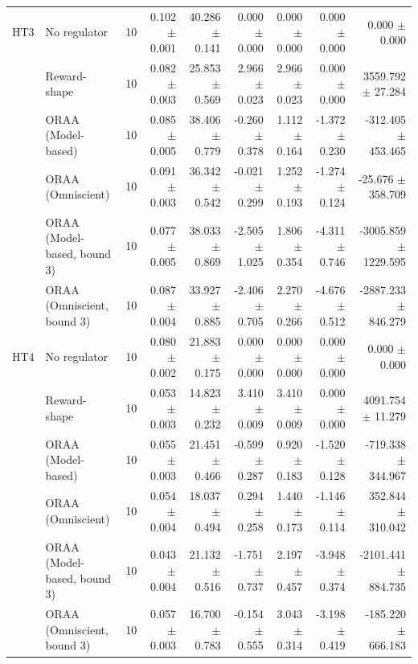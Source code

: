 \begin{tabular}{llrrrrrrr}
\addlinespace
HT3 & No regulator & 10 & 0.102 $\pm$ 0.001 & 40.286 $\pm$ 0.141 & 0.000 $\pm$ 0.000 & 0.000 $\pm$ 0.000 & 0.000 $\pm$ 0.000 & 0.000 $\pm$ 0.000 \\
 & Reward-shape & 10 & 0.082 $\pm$ 0.003 & 25.853 $\pm$ 0.569 & 2.966 $\pm$ 0.023 & 2.966 $\pm$ 0.023 & 0.000 $\pm$ 0.000 & 3559.792 $\pm$ 27.284 \\
 & ORAA (Model-based) & 10 & 0.085 $\pm$ 0.005 & 38.406 $\pm$ 0.779 & -0.260 $\pm$ 0.378 & 1.112 $\pm$ 0.164 & -1.372 $\pm$ 0.230 & -312.405 $\pm$ 453.465 \\
 & ORAA (Omniscient) & 10 & 0.091 $\pm$ 0.003 & 36.342 $\pm$ 0.542 & -0.021 $\pm$ 0.299 & 1.252 $\pm$ 0.193 & -1.274 $\pm$ 0.124 & -25.676 $\pm$ 358.709 \\
 & ORAA (Model-based, bound 3) & 10 & 0.077 $\pm$ 0.005 & 38.033 $\pm$ 0.869 & -2.505 $\pm$ 1.025 & 1.806 $\pm$ 0.354 & -4.311 $\pm$ 0.746 & -3005.859 $\pm$ 1229.595 \\
 & ORAA (Omniscient, bound 3) & 10 & 0.087 $\pm$ 0.004 & 33.927 $\pm$ 0.885 & -2.406 $\pm$ 0.705 & 2.270 $\pm$ 0.266 & -4.676 $\pm$ 0.512 & -2887.233 $\pm$ 846.279 \\
\addlinespace
HT4 & No regulator & 10 & 0.080 $\pm$ 0.002 & 21.883 $\pm$ 0.175 & 0.000 $\pm$ 0.000 & 0.000 $\pm$ 0.000 & 0.000 $\pm$ 0.000 & 0.000 $\pm$ 0.000 \\
 & Reward-shape & 10 & 0.053 $\pm$ 0.003 & 14.823 $\pm$ 0.232 & 3.410 $\pm$ 0.009 & 3.410 $\pm$ 0.009 & 0.000 $\pm$ 0.000 & 4091.754 $\pm$ 11.279 \\
 & ORAA (Model-based) & 10 & 0.055 $\pm$ 0.003 & 21.451 $\pm$ 0.466 & -0.599 $\pm$ 0.287 & 0.920 $\pm$ 0.183 & -1.520 $\pm$ 0.128 & -719.338 $\pm$ 344.967 \\
 & ORAA (Omniscient) & 10 & 0.054 $\pm$ 0.004 & 18.037 $\pm$ 0.494 & 0.294 $\pm$ 0.258 & 1.440 $\pm$ 0.173 & -1.146 $\pm$ 0.114 & 352.844 $\pm$ 310.042 \\
 & ORAA (Model-based, bound 3) & 10 & 0.043 $\pm$ 0.004 & 21.132 $\pm$ 0.516 & -1.751 $\pm$ 0.737 & 2.197 $\pm$ 0.457 & -3.948 $\pm$ 0.374 & -2101.441 $\pm$ 884.735 \\
 & ORAA (Omniscient, bound 3) & 10 & 0.057 $\pm$ 0.003 & 16.700 $\pm$ 0.783 & -0.154 $\pm$ 0.555 & 3.043 $\pm$ 0.314 & -3.198 $\pm$ 0.419 & -185.220 $\pm$ 666.183 \\
\bottomrule
\end{tabular}

